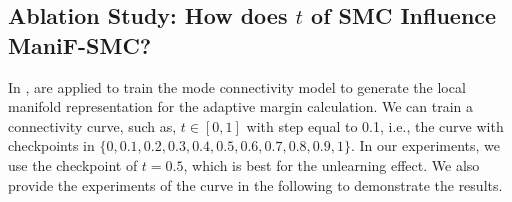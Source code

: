 \begin{table}[t]
	\caption{Evaluation of checkpoints sampled on the connectivity curve on MNIST. \vspace{-2mm}}
	\label{tab_mnist_connectivity_curve}
\end{table}


\subsection{Ablation Study: How does $t$ of SMC Influence ManiF-SMC?} \label{t_eval}

 
	
In ,  are applied to train the mode connectivity model to generate the local manifold representation for the adaptive margin calculation. We can train a connectivity curve, such as, $t \in [0,1]$ with step equal to 0.1, i.e., the curve with checkpoints in $\{0, 0.1, 0.2, 0.3, 0.4, 0.5, 0.6, 0.7, 0.8, 0.9, 1\}$. 
In our experiments, we use the checkpoint of $t = 0.5$, which is best for the unlearning effect. We also provide the experiments of the curve in the following  to demonstrate the results.



